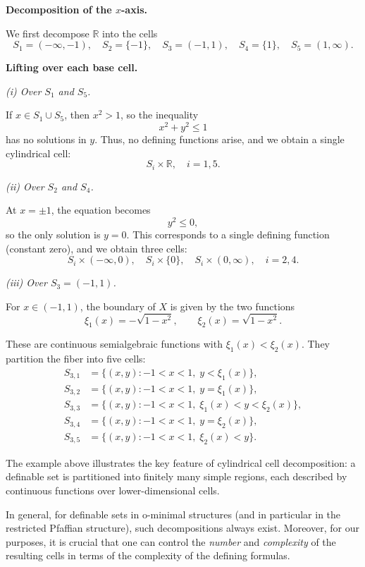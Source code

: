 \documentclass[11pt]{article}
\theoremstyle{plain}
\theoremstyle{definition}
\theoremstyle{remark}
\newcommand{\R}{\mathbb{R}}
\begin{document}
\medskip
\noindent
\textbf{Decomposition of the $x$-axis.}

We first decompose $\R$ into the cells
\[
S_1 = (-\infty,-1),\quad
S_2 = \{-1\},\quad
S_3 = (-1,1),\quad
S_4 = \{1\},\quad
S_5 = (1,\infty).
\]

\medskip
\noindent
\textbf{Lifting over each base cell.}

\smallskip
\emph{(i) Over $S_1$ and $S_5$.}

If $x \in S_1 \cup S_5$, then $x^2 > 1$, so the inequality
\[
x^2 + y^2 \le 1
\]
has no solutions in $y$. Thus, no defining functions arise, and we obtain a single cylindrical cell:
\[
S_i \times \R, \quad i=1,5.
\]

\smallskip
\emph{(ii) Over $S_2$ and $S_4$.}

At $x=\pm 1$, the equation becomes
\[
y^2 \le 0,
\]
so the only solution is $y=0$. This corresponds to a single defining function (constant zero), and we obtain three cells:
\[
S_i \times (-\infty,0),\quad
S_i \times \{0\},\quad
S_i \times (0,\infty),
\quad i=2,4.
\]

\smallskip
\emph{(iii) Over $S_3 = (-1,1)$.}

For $x \in (-1,1)$, the boundary of $X$ is given by the two functions
\[
\xi_1(x) = -\sqrt{1 - x^2},
\qquad
\xi_2(x) = \sqrt{1 - x^2}.
\]

These are continuous semialgebraic functions with $\xi_1(x) < \xi_2(x)$.
They partition the fiber into five cells:
\[
\begin{aligned}
S_{3,1} &= \{(x,y) : -1<x<1,\; y < \xi_1(x)\}, \\
S_{3,2} &= \{(x,y) : -1<x<1,\; y = \xi_1(x)\}, \\
S_{3,3} &= \{(x,y) : -1<x<1,\; \xi_1(x) < y < \xi_2(x)\}, \\
S_{3,4} &= \{(x,y) : -1<x<1,\; y = \xi_2(x)\}, \\
S_{3,5} &= \{(x,y) : -1<x<1,\; \xi_2(x) < y\}.
\end{aligned}
\]



\medskip
\noindent
The example above illustrates the key feature of cylindrical cell
decomposition: a definable set is partitioned into finitely many simple
regions, each described by continuous functions over lower-dimensional
cells.

In general, for definable sets in o-minimal structures (and in particular
in the restricted Pfaffian structure), such decompositions always exist.
Moreover, for our purposes, it is crucial that one can control the
\emph{number} and \emph{complexity} of the resulting cells in terms of
the complexity of the defining formulas.
\end{document}
